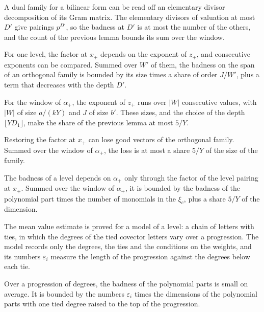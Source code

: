A dual family for a bilinear form can be read off an elementary divisor decomposition of its Gram matrix. The
elementary divisors of valuation at most $D'$ give pairings $p^{D'}$, so the badness at $D'$ is at most the number
of the others, and the count of the previous lemma bounds its sum over the window.

For one level, the factor at $x_+$ depends on the exponent of $z_+$, and consecutive exponents can be compared.
Summed over $W'$ of them, the badness on the span of an orthogonal family is bounded by its size times a
share of order $J/W'$, plus a term that decreases with the depth $D'$.

For the window of $\alpha_+$, the exponent of $z_+$ runs over $|W|$ consecutive values, with $|W|$ of size $a/(kY)$
and $J$ of size $b'$. These sizes, and the choice of the depth $\lfloor YD_1\rfloor$, make the share of the
previous lemma at most $5/Y$.

Restoring the factor at $x_+$ can lose good vectors of the orthogonal family. Summed over the window of
$\alpha_+$, the loss is at most a share $5/Y$ of the size of the family.

The badness of a level depends on $\alpha_+$ only through the factor of the level pairing at $x_+$. Summed
over the window of $\alpha_+$, it is bounded by the badness of the polynomial part times the number of
monomials in the $\xi_c$, plus a share $5/Y$ of the dimension.

The mean value estimate is proved for a model of a level: a chain of letters with ties, in which the degrees
of the tied covector letters vary over a progression. The model records only the degrees, the ties and the
conditions on the weights, and its numbers $\varepsilon_i$ measure the length of the progression against
the degrees below each tie.

Over a progression of degrees, the badness of the polynomial parts is small on average. It is bounded by
the numbers $\varepsilon_i$ times the dimensions of the polynomial parts with one tied degree raised to the
top of the progression.

